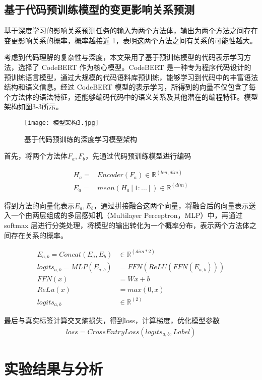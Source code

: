 \subsection{基于代码预训练模型的变更影响关系预测}

基于深度学习的影响关系预测任务的输入为两个方法体，输出为两个方法之间存在变更影响关系的概率，概率越接近 1，表明这两个方法之间有关系的可能性越大。

考虑到代码理解的复杂性与深度，本文采用了基于预训练模型的代码表示学习方法，选择了 CodeBERT 作为核心模型。CodeBERT 是一种专为程序代码设计的预训练语言模型，通过大规模的代码语料库预训练，能够学习到代码中的丰富语法结构和语义信息。经过 CodeBERT 模型的表示学习，所得到的向量不仅包含了每个方法体的语法特征，还能够编码代码中的语义关系及其他潜在的编程特征。模型架构如图3-3所示。

\begin{figure}[h]
\centering
\texttt{[image: 模型架构3.jpg]}
\caption{基于代码预训练的深度学习模型架构}
\end{figure}


首先，将两个方法体$ F_a, F_b$，先通过代码预训练模型进行编码

\begin{align}
H_a=&Encoder(F_a) \in \mathbb{R}^{(len,dim)} \\
E_a=&mean(H_a[1:...]) \in \mathbb{R}^{(dim)}
\end{align}

得到方法的向量化表示$ E_a, E_b$，通过拼接融合这两个向量，将融合后的向量表示送入一个由两层组成的多层感知机（Multilayer Perceptron，MLP）中，再通过 softmax 层进行分类处理，将模型的输出转化为一个概率分布，表示两个方法体之间存在关系的概率。

\begin{align}
E_{a,b}=Concat(E_a,E_b)& \in \mathbb{R}^{(dim*2)} \\
logits_{a,b}=MLP(E_{a,b})&=FFN(ReLU(FFN(E_{a,b}))) \\
FFN(x)&=Wx+b\\
ReLu(x)&=max(0,x)\\
logits_{a,b}& \in \mathbb{R}^{(2)}
\end{align}

最后与真实标签计算交叉熵损失，得到loss，计算梯度，优化模型参数
\begin{align}
loss=CrossEntryLoss(logits_{a,b}, Label)
\end{align}

\section{实验结果与分析}

